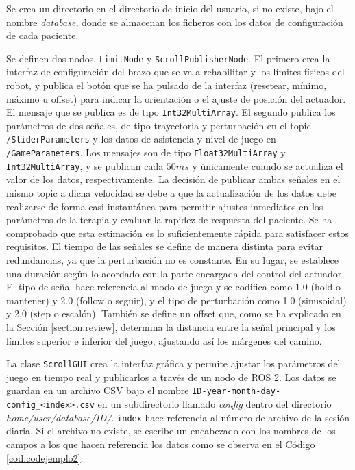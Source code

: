 Se crea un directorio en el directorio de inicio del usuario, si no existe, bajo el nombre \textit{database}, donde se almacenan los ficheros con los datos de configuración de cada paciente.

Se definen dos nodos, \verb|LimitNode| y \verb|ScrollPublisherNode|.
El primero crea la interfaz de configuración del brazo que se va a rehabilitar y los límites físicos del robot, y publica el botón que se ha pulsado de la interfaz (resetear, mínimo, máximo u offset) para indicar la orientación o el ajuste de posición del actuador.
El mensaje que se publica es de tipo \verb|Int32MultiArray|.
El segundo publica los parámetros de dos señales, de tipo trayectoria y perturbación en el topic \verb|/SliderParameters| y los datos de asistencia y nivel de juego en \verb|/GameParameters|.
Los mensajes son de tipo \verb|Float32MultiArray| y \verb|Int32MultiArray|, y se publican cada $50 ms$ y únicamente cuando se actualiza el valor de los datos, respectivamente.
La decisión de publicar ambas señales en el mismo topic a dicha velocidad se debe a que la actualización de los datos debe realizarse de forma casi instantánea para permitir ajustes inmediatos en los parámetros de la terapia y evaluar la rapidez de respuesta del paciente.
Se ha comprobado que esta estimación es lo suficientemente rápida para satisfacer estos requisitos.
El tiempo de las señales se define de manera distinta para evitar redundancias, ya que la perturbación no es constante.
En su lugar, se establece una duración según lo acordado con la parte encargada del control del actuador.
El tipo de señal hace referencia al modo de juego y se codifica como 1.0 (hold o mantener) y 2.0 (follow o seguir), y el tipo de perturbación como 1.0 (sinusoidal) y 2.0 (step o escalón).
También se define un offset que, como se ha explicado en la Sección \ref{section:review}, determina la distancia entre la señal principal y los límites superior e inferior del juego, ajustando así los márgenes del camino.

La clase \verb|ScrollGUI| crea la interfaz gráfica y permite ajustar los parámetros del juego en tiempo real y publicarlos a través de un nodo de ROS 2.
Los datos se guardan en un archivo CSV bajo el nombre \verb|ID-year-month-day-config_<index>.csv| en un subdirectorio llamado \textit{config} dentro del directorio \textit{home/user/database/ID/}.
\verb|index| hace referencia al número de archivo de la sesión diaria.
Si el archivo no existe, se escribe un encabezado con los nombres de los campos a los que hacen referencia los datos como se observa en el Código \ref{cod:codejemplo2}.

